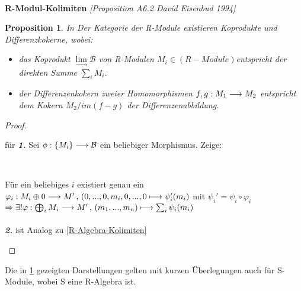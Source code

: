 \documentclass[10pt,a4paper]{report}
\newcommand{\ModulsOfDifferenzials}{David Eisenbud 1994}
\newcounter{Aussage}[chapter]
\newtheorem{prop}[Aussage]{Proposition}
\newcommand{\functionfront}[3]{\nolinebreak{#1:#2 \longrightarrow #3}}
\newcommand{\function}[5]{\nolinebreak{#1:#2 \longrightarrow #3 \, , \, #4 \longmapsto #5}}
\newcommand{\colimes}[0]{\lim\limits_{ \longrightarrow }}
\newcommand{\immage}[1]{im(#1)}
\begin{document}
\ \\
\textbf{R-Modul-Kolimiten} \textit{[Proposition A6.2 \ModulsOfDifferenzials]}
\begin{prop}\label{R-Modul-Kolimiten}
In Der Kategorie der R-Module  existieren Koprodukte und Differenzkokerne, wobei:
\begin{itemize}
\item[\textbf{1.}] das Koprodukt $\colimes \mathcal{B}$ von R-Modulen $M_i \in (R-Module)$entspricht der direkten Summe $\sum_i M_i$.
\item[\textbf{2.}] der Differenzenkokern zweier Homomorphismen $\functionfront{f,g}{M_1}{M_2}$ entspricht dem Kokern $M_2/\immage{f-g}$ der Differenzenabbildung.
\end{itemize}
\end{prop}
\begin{proof}
\begin{itemize}

für \textit{\textbf{1.}} Sei $\functionfront{\phi}{\lbrace M_i \rbrace}{\mathcal{B}}$ ein beliebiger Morphismus. Zeige: \\
\begin{center}
\\
\end{center}
Für ein beliebiges $i$ existiert genau ein $\function{\varphi_i}{M_i \oplus 0}{M'}{(0,...,0,m_i,0,...,0}{\psi_i '(m_i)}$
 mit $\psi_i ' = \psi_i \circ \varphi_i$\\
$\Rightarrow  \exists ! \function{\varphi}{\bigoplus_i M_i}{M'}{(m_1,...,m_n)}{\sum_i \psi_i(m_i)}$\\
\ \\
\textit{\textbf{2.}} ist Analog zu \cref{R-Algebra-Kolimiten}
\end{itemize}
\end{proof}
Die in \cref{R-Modul-Kolimiten} gezeigten Darstellungen gelten mit kurzen Überlegungen auch für S-Module, wobei S eine R-Algebra ist.\\
\end{document}
